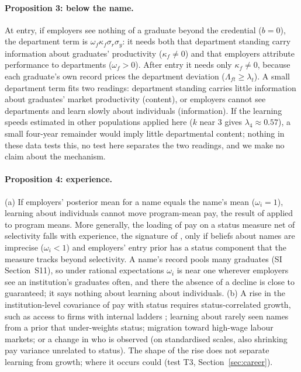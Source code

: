 \documentclass[11pt]{article}
\newcommand{\SI}[1]{SI Section~S#1}
\newcommand{\SItheory}{\SI{11}}
\begin{document}
\paragraph{Proposition 3: below the name.} At entry, if employers see nothing of a graduate beyond the credential
($b=0$), the department term is $\omega_f\kappa_f\sigma_r\sigma_y$: it needs both that department standing carry
information about graduates' productivity ($\kappa_f\neq0$) and that employers attribute performance to
departments ($\omega_f>0$). After entry it needs only $\kappa_f\neq0$, because each graduate's own record prices
the department deviation ($\Lambda_{ft}\ge\lambda_t$). A small department term fits two readings: department
standing carries little information about graduates' market productivity (content), or employers cannot see
departments and learn slowly about individuals (information). If the learning speeds estimated in other
populations \citep{lange2007speed,arcidiacono2010beyond} applied here ($k$ near 3 gives $\lambda_4\approx0.57$), a
small four-year remainder would imply little departmental content; nothing in these data tests this, no test here
separates the two readings, and we make no claim about the mechanism.

\paragraph{Proposition 4: experience.} (a) If employers' posterior mean for a name equals the name's mean
($\omega_i=1$), learning about individuals cannot move program-mean pay, the result of \citet{farber1996learning}
applied to program means. More generally, the loading of pay on a status measure net of selectivity falls with
experience, the signature of \citet{altonji2001employer}, only if beliefs about names are imprecise ($\omega_i<1$)
and employers' entry prior has a status component that the measure tracks beyond selectivity. A name's record
pools many graduates (\SItheory), so under rational expectations $\omega_i$ is near one wherever employers see an
institution's graduates often, and there the absence of a decline is close to guaranteed; it says nothing about
learning about individuals.
(b) A rise in the institution-level covariance of pay with status requires status-correlated growth, such as
access to firms with internal ladders \citep{gibbons1999theory,rivera2015pedigree,weinstein2018employer};
learning about rarely seen names from a prior that under-weights status; migration toward high-wage labour
markets; or a change in who is observed (on standardised scales, also shrinking pay variance unrelated to
status). The shape of the rise does not separate learning from growth; where it occurs could (test T3,
Section~\ref{sec:career}).
\end{document}
